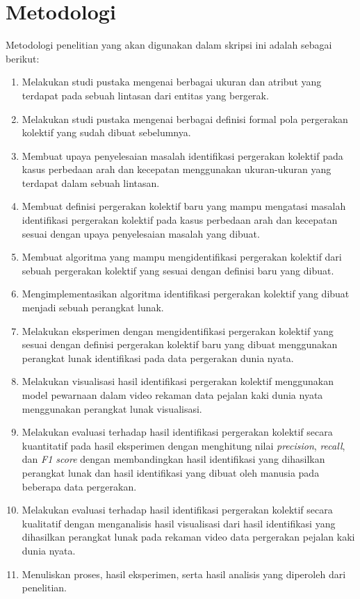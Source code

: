 \section{Metodologi}
\label{sec:metlit}

Metodologi penelitian yang akan digunakan dalam skripsi ini adalah sebagai berikut:

\begin{enumerate}
    \item Melakukan studi pustaka mengenai berbagai ukuran dan atribut yang terdapat pada sebuah lintasan dari entitas yang bergerak.
    \item Melakukan studi pustaka mengenai berbagai definisi formal pola pergerakan kolektif yang sudah dibuat sebelumnya.
    \item Membuat upaya penyelesaian masalah identifikasi pergerakan kolektif pada kasus perbedaan arah dan kecepatan menggunakan ukuran-ukuran yang terdapat dalam sebuah lintasan.
    \item Membuat definisi pergerakan kolektif baru yang mampu mengatasi masalah identifikasi pergerakan kolektif pada kasus perbedaan arah dan kecepatan sesuai dengan upaya penyelesaian masalah yang dibuat.
    \item Membuat algoritma yang mampu mengidentifikasi pergerakan kolektif dari sebuah pergerakan kolektif yang sesuai dengan definisi baru yang dibuat.
    \item Mengimplementasikan algoritma identifikasi pergerakan kolektif yang dibuat menjadi sebuah perangkat lunak.
    \item Melakukan eksperimen dengan mengidentifikasi pergerakan kolektif yang sesuai dengan definisi pergerakan kolektif baru yang dibuat menggunakan perangkat lunak identifikasi pada data pergerakan dunia nyata.
    \item Melakukan visualisasi hasil identifikasi pergerakan kolektif menggunakan model pewarnaan dalam video rekaman data pejalan kaki dunia nyata menggunakan perangkat lunak visualisasi.
    \item Melakukan evaluasi terhadap hasil identifikasi pergerakan kolektif secara kuantitatif pada hasil eksperimen dengan menghitung nilai \textit{precision}, \textit{recall}, dan \textit{F1 score} dengan membandingkan hasil identifikasi yang dihasilkan perangkat lunak dan hasil identifikasi yang dibuat oleh manusia pada beberapa data pergerakan.
    \item Melakukan evaluasi terhadap hasil identifikasi pergerakan kolektif secara kualitatif dengan menganalisis hasil visualisasi dari hasil identifikasi yang dihasilkan perangkat lunak pada rekaman video data pergerakan pejalan kaki dunia nyata.
    \item Menuliskan proses, hasil eksperimen, serta hasil analisis yang diperoleh dari penelitian.
\end{enumerate}

